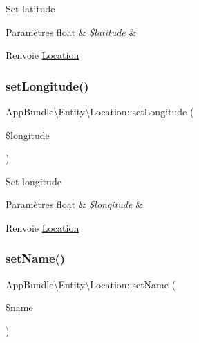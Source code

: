 Set latitude


\begin{DoxyParams}[1]{Paramètres}
float & {\em \$latitude} & \\
\hline
\end{DoxyParams}
\begin{DoxyReturn}{Renvoie}
\hyperlink{classAppBundle_1_1Entity_1_1Location}{Location} 
\end{DoxyReturn}
\mbox{\label{classAppBundle_1_1Entity_1_1Location_a0591ba9da720d3334013549916c3347b}} 
\subsubsection{\texorpdfstring{set\+Longitude()}{setLongitude()}}
{\footnotesize\ttfamily App\+Bundle\textbackslash{}\+Entity\textbackslash{}\+Location\+::set\+Longitude (\begin{DoxyParamCaption}\item[{}]{\$longitude }\end{DoxyParamCaption})}

Set longitude


\begin{DoxyParams}[1]{Paramètres}
float & {\em \$longitude} & \\
\hline
\end{DoxyParams}
\begin{DoxyReturn}{Renvoie}
\hyperlink{classAppBundle_1_1Entity_1_1Location}{Location} 
\end{DoxyReturn}
\mbox{\label{classAppBundle_1_1Entity_1_1Location_a9a0d9075d1a1fa5e2efea262412045d0}} 
\subsubsection{\texorpdfstring{set\+Name()}{setName()}}
{\footnotesize\ttfamily App\+Bundle\textbackslash{}\+Entity\textbackslash{}\+Location\+::set\+Name (\begin{DoxyParamCaption}\item[{}]{\$name }\end{DoxyParamCaption})}

